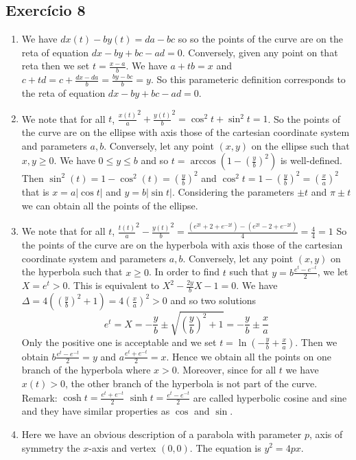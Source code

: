 \subsection*{Exercício 8}

\begin{enumerate}
\item We have $d x(t) - b y(t) = da - bc$ so
  so the points of the curve are on the reta of equation
  $dx - by + bc - ad = 0$. Conversely, given any point on that reta
  then we set $t = \frac{x-a}{b}$. We have $a+tb = x$ and
  $c + td = c + \frac{dx-da}{b} = \frac{by - bc}{b} = y$. So this
  parameteric definition corresponds to the reta of equation
  $dx - by + bc - ad = 0$.

\item We note that for all $t$,
  ${\frac{x(t)}{a}}^2 + {\frac{y(t)}{b}}^2 = \cos^2{t} + \sin^2{t} = 1$.
  So the points of the curve are on the ellipse with axis those of the
  cartesian coordinate system and parameters $a,b$.
  Conversely, let any point $(x,y)$ on the ellipse such that $x,y \geq 0$.
  We have $0 \leq y \leq b$ and so
  $t = \arccos\left(1 - \left(\frac{y}{b}\right)^2\right)$ is well-defined.
  Then $\sin^2{(t)} = 1 - \cos^2{(t)} = \left(\frac{y}{b}\right)^2$
  and $\cos^2{t} = 1 - \left(\frac{y}{b}\right)^2 =
  \left(\frac{x}{a}\right)^2$ that is
  $x = a{|\cos{t}|}$ and
  $y = b{|\sin{t}|}$. Considering the parameters
  $\pm t$ and $\pi \pm t$ we can obtain all the points of the ellipse.

\item We note that for all $t$,
  ${\frac{t(t)}{a}}^2 - {\frac{y(t)}{b}}^2 =
  \frac{{(e^{2t}+2+e^{-2t})}-{(e^{2t}-2+e^{-2t})}}{4} = \frac{4}{4}=1$
  So the points of the curve are on the hyperbola with axis those of the
  cartesian coordinate system and parameters $a,b$.
  Conversely, let any point $(x,y)$ on the hyperbola such that $x \geq 0$.
  In order to find $t$ such that $y = b \frac{e^t-e^{-t}}{2}$,
  we let $X=e^{t} > 0$. This is equivalent to
  $X^2 - \frac{2y}{b} X - 1 = 0$. We have $\Delta =
  4\left(\left(\frac{y}{b}\right)^2+1\right) = 4\left(\frac{x}{a}\right)^2 > 0$
  and so two solutions
  $$e^t = X =
  {-\frac{y}{b} \pm \sqrt{\left(\frac{y}{b}\right)^2+1}} =
  {-\frac{y}{b} \pm \frac{x}{a}}$$
  Only the positive one is acceptable and we set
  $t = \ln\left(-\frac{y}{b} + \frac{x}{a}\right)$.
  Then we obtain
  $b \frac{e^t-e^{-t}}{2} = y$ and
  $a \frac{e^t+e^{-t}}{2} = x$. Hence we obtain all the points on one branch
  of the hyperbola where $x > 0$. Moreover, since for all $t$ we have
  $x(t) > 0$, the other branch of the hyperbola is not part of the curve.
  Remark: $\cosh{t} = \frac{e^t+e^{-t}}{2}$
  $\sinh{t} = \frac{e^t-e^{-t}}{2}$ are called hyperbolic cosine and sine and
  they have similar properties as $\cos$ and $\sin$.

\item Here we have an obvious description of a parabola with parameter $p$,
  axis of symmetry the $x$-axis and vertex $(0,0)$. The equation is
  $y^2 = 4px$.

\end{enumerate}

